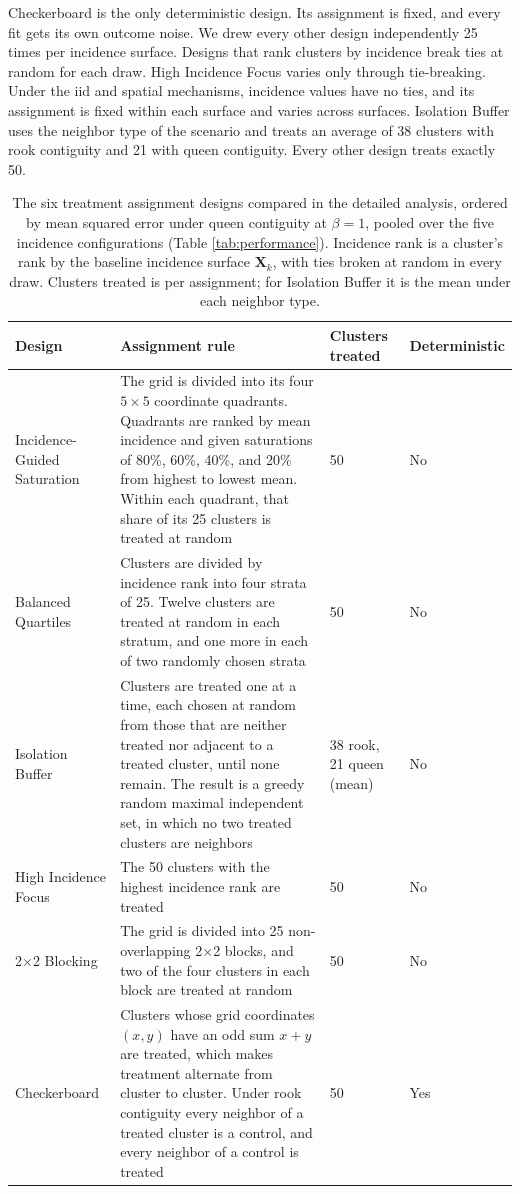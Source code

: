 \documentclass[11pt]{article}
\begin{document}
Checkerboard is the only deterministic design. Its assignment is fixed,
and every fit gets its own outcome noise. We drew every other design
independently 25 times per incidence surface. Designs that rank clusters
by incidence break ties at random for each draw. High Incidence Focus
varies only through tie-breaking. Under the iid and spatial mechanisms,
incidence values have no ties, and its assignment is fixed within each
surface and varies across surfaces. Isolation Buffer uses the neighbor
type of the scenario and treats an average of 38 clusters with rook
contiguity and 21 with queen contiguity. Every other design treats exactly 50.

\iffullsi
\begin{table}[!htb]

\small
\centering

\caption{The six treatment assignment designs compared in the detailed analysis, ordered by mean squared error under queen contiguity at $\beta = 1$, pooled over the five incidence configurations (Table \ref{tab:performance}). Incidence rank is a cluster's rank by the baseline incidence surface $\mathbf{X}_k$, with ties broken at random in every draw. Clusters treated is per assignment; for Isolation Buffer it is the mean under each neighbor type.}
\label{tab:designs}

\begin{tabular}{p{3.4cm}p{6.4cm}p{2.0cm}p{2.3cm}}

\toprule
Design & Assignment rule & Clusters treated & Deterministic \\

\midrule
Incidence-Guided Saturation & The grid is divided into its four $5\times5$ coordinate quadrants. Quadrants are ranked by mean incidence and given saturations of 80\%, 60\%, 40\%, and 20\% from highest to lowest mean. Within each quadrant, that share of its 25 clusters is treated at random & 50 & No \\
Balanced Quartiles & Clusters are divided by incidence rank into four strata of 25. Twelve clusters are treated at random in each stratum, and one more in each of two randomly chosen strata & 50 & No \\
Isolation Buffer & Clusters are treated one at a time, each chosen at random from those that are neither treated nor adjacent to a treated cluster, until none remain. The result is a greedy random maximal independent set, in which no two treated clusters are neighbors & \raggedright 38 rook, 21 queen (mean) & No \\
High Incidence Focus & The 50 clusters with the highest incidence rank are treated & 50 & No \\
2$\times$2 Blocking & The grid is divided into 25 non-overlapping 2$\times$2 blocks, and two of the four clusters in each block are treated at random & 50 & No \\
Checkerboard & Clusters whose grid coordinates $(x, y)$ have an odd sum $x + y$ are treated, which makes treatment alternate from cluster to cluster. Under rook contiguity every neighbor of a treated cluster is a control, and every neighbor of a control is treated & 50 & Yes \\


\end{tabular}
\end{table}
\end{document}
